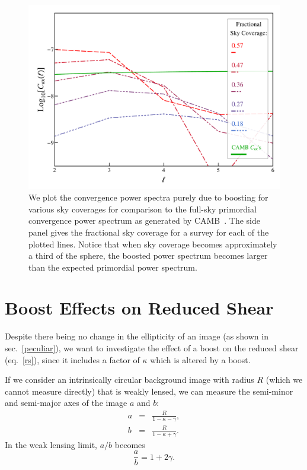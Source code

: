 \documentclass[useAMS,fleqn, usenatbib]{mn2e}
\begin{document}
\begin{figure}
	\includegraphics[scale=.23]{Ckkplot.pdf}
	\caption{We plot the convergence power spectra purely due to boosting for various sky coverages
	for comparison to the full-sky primordial convergence power spectrum as generated by 
	{CAMB\sc}~\citep{Lewis:1999bs}. The side panel gives the fractional sky coverage for a survey
	for each of the plotted lines. Notice that when sky coverage becomes approximately a third of the sphere,
	the boosted power spectrum becomes larger than the expected primordial power
	spectrum. }\label{ps_plot}
\end{figure}

\section{Boost Effects on Reduced Shear}
\label{reduced}
Despite there being no change in the ellipticity of an image (as shown in sec.~\ref{peculiar}),
we want to investigate the effect of a boost on the reduced shear (eq.~\ref{rs}), since it includes a factor
of $\kappa$ which is altered by a boost.

If we consider an intrinsically circular background image with radius $R$ (which
we cannot measure directly) that is weakly lensed, we can measure the semi-minor and semi-major
axes of the image $a$ and $b$:
\begin{eqnarray}
a & = & \frac{R}{1-\kappa-\gamma},\\
b & = & \frac{R}{1-\kappa+\gamma}.
\end{eqnarray}
In the weak lensing limit, $a/b$ becomes
\begin{equation}
\frac{a}{b}=1+2\gamma .
\end{equation}
\end{document}
